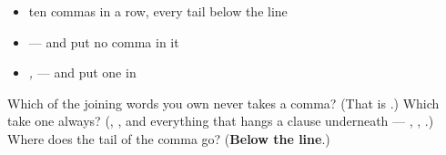 \begin{itemize}
\raggedright
  \item ten commas in a row, every tail below the line
  \item \emph{   } — and put no comma in it
  \item \emph{  ,     } — and put one in
\end{itemize}

\begin{tcolorbox}[breakable,colback=teal!4,colframe=teal!35!black,title={Before you move on}]
Which of the joining words you own never takes a comma? (That is \textbf{}.) Which take one always? (\textbf{}, \textbf{}, and everything that hangs a clause underneath — \textbf{}, \textbf{ }, \textbf{}.) Where does the tail of the comma go? (\textbf{Below the line}.)
\end{tcolorbox}
